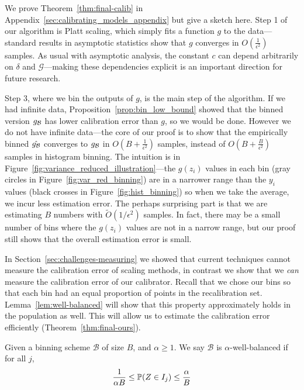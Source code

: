 We prove Theorem~\ref{thm:final-calib} in Appendix~\ref{sec:calibrating_models_appendix} but give a sketch here. Step 1 of our algorithm is Platt scaling, which simply fits a function $g$ to the data---standard results in asymptotic statistics show that $g$ converges in $O(\frac{1}{\epsilon^2})$ samples.
As usual with asymptotic analysis, the constant $c$ can depend arbitrarily on $\delta$ and $\mathcal{G}$---making these dependencies explicit is an important direction for future research.

Step 3, where we bin the outputs of $g$, is the main step of the algorithm. If we had infinite data, Proposition~\ref{prop:bin_low_bound} showed that the binned version $g_{\mathcal{B}{}}$ has lower calibration error than $g$, so we would be done. However we do not have infinite data---the core of our proof is to show that the empirically binned $\hat{g_{\mathcal{B}{}}}$ converges to $g_{\mathcal{B}{}}$ in $O(B + \frac{1}{\epsilon^2})$ samples, instead of $O(B + \frac{B}{\epsilon^2})$ samples in histogram binning. The intuition is in Figure~\ref{fig:variance_reduced_illustration}---the $g(z_i)$ values in each bin (gray circles in Figure~\ref{fig:var_red_binning}) are in a narrower range than the $y_i$ values (black crosses in Figure~\ref{fig:hist_binning}) so when we take the average, we incur less estimation error. The perhaps surprising part is that we are estimating $B$ numbers with $\widetilde{O}(1/\epsilon^2)$ samples. In fact, there may be a small number of bins where the $g(z_i)$ values are not in a narrow range, but our proof still shows that the overall estimation error is small.

In Section~\ref{sec:challenges-measuring} we showed that current techniques cannot measure the calibration error of scaling methods, in contrast we show that we \emph{can} measure the calibration error of our calibrator. Recall that we chose our bins so that each bin had an equal proportion of points in the recalibration set. Lemma~\ref{lem:well-balanced} will show that this property approximately holds in the population as well. This will allow us to estimate the calibration error efficiently (Theorem~\ref{thm:final-ours}).

\begin{definition}
Given a binning scheme $\mathcal{B}$ of size $B$, and $\alpha \geq 1$. We say $\mathcal{B}$ is $\alpha$-well-balanced if for all $j$,
  \[ \frac{1}{\alpha B} \leq \mathbb{P}(Z \in I_j) \leq \frac{\alpha}{B}\]
\end{definition}

